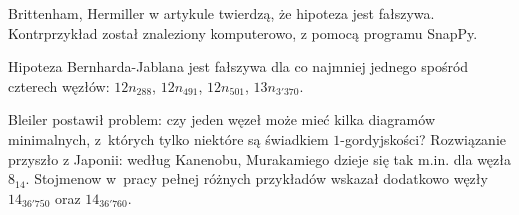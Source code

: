 Brittenham, Hermiller w artykule \cite{brittenham21} twierdzą, że hipoteza jest fałszywa.
Kontrprzykład został znaleziony komputerowo, z pomocą programu SnapPy.
%
%
%

\begin{example}
%
%
%
%
    Hipoteza Bernharda-Jablana jest fałszywa dla co najmniej jednego spośród czterech węzłów: $12n_{288}$, $12n_{491}$, $12n_{501}$, $13n_{3'370}$.
\end{example}

Bleiler \cite{bleiler84} postawił problem: czy jeden węzeł może mieć kilka diagramów minimalnych, z~których tylko niektóre są świadkiem $1$-gordyjskości?
Rozwiązanie przyszło z Japonii: według Kanenobu, Murakamiego \cite{kanenobumurakami86} dzieje się tak m.in. dla węzła $8_{14}$.
%
%
%
Stojmenow w~pracy \cite{stoimenow01} pełnej różnych przykładów wskazał dodatkowo węzły $14_{36'750}$ oraz $14_{36'760}$.
%
%
%


